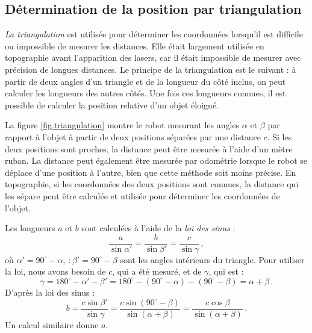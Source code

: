 \subsection{Détermination de la position par triangulation}

\emph{La triangulation} est utilisée pour déterminer les coordonnées lorsqu'il est difficile ou impossible de mesurer les distances. Elle était largement utilisée en topographie avant l'apparition des lasers, car il était impossible de mesurer avec précision de longues distances. Le principe de la triangulation est le suivant : à partir de deux angles d'un triangle et de la longueur du côté inclus, on peut calculer les longueurs des autres côtés. Une fois ces longueurs connues, il est possible de calculer la position relative d'un objet éloigné.

La figure \ref{fig.triangulation} montre le robot mesurant les angles $\alpha$ et $\beta$ par rapport à l'objet à partir de deux positions séparées par une distance $c$. Si les deux positions sont proches, la distance peut être mesurée à l'aide d'un mètre ruban. La distance peut également être mesurée par odométrie lorsque le robot se déplace d'une position à l'autre, bien que cette méthode soit moins précise. En topographie, si les coordonnées des deux positions sont connues, la distance qui les sépare peut être calculée et utilisée pour déterminer les coordonnées de l'objet.

Les longueurs $a$ et $b$ sont calculées à l'aide de la \emph{loi des sinus} :
\begin{displaymath}
\frac{a}{\sin\alpha'} = \frac{b}{\sin\beta'} = \frac{c}{\sin\gamma}\,,
\end{displaymath}
où $\alpha' = 90^{\circ} - \alpha, \ : \beta' = 90^{\circ} - \beta$ sont les angles intérieurs du triangle. Pour utiliser la loi, nous avons besoin de $c$, qui a été mesuré, et de $\gamma$, qui est :
\begin{displaymath}
\gamma = 180^{\circ}-\alpha'-\beta' = 180^{\circ} - (90^{\circ} -
\alpha) - (90^{\circ} - \beta) = \alpha + \beta\,.
\end{displaymath}
D'après la loi des sinus :
\begin{displaymath}
b = \frac{c\sin\beta'}{\sin\gamma} =
\frac{c\sin (90^{\circ} - \beta)}{\sin (\alpha + \beta)} =
\frac{c\cos\beta}{\sin (\alpha + \beta)}\,.
\end{displaymath}
Un calcul similaire donne $a$.

